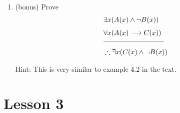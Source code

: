 \documentclass[11pt]{amsart}
\begin{document}
\begin{enumerate}
\item (bonus) Prove
\begin{align*}
&\exists{x}(A(x)\land\neg B(x))\\[4pt]
&\forall{x}(A(x) \longrightarrow C(x))\\[4pt]
\noalign{\kern -10pt}
&\vrule width 1.2truein height 0pt depth .4pt\\[4pt] 
&\therefore \exists{x}(C(x)\land \neg B(x))\\[4pt]
\end{align*}
Hint: This is very similar to example 4.2 in the text.\\[5pt]

\end{enumerate}


\section{Lesson 3}
\end{document}
